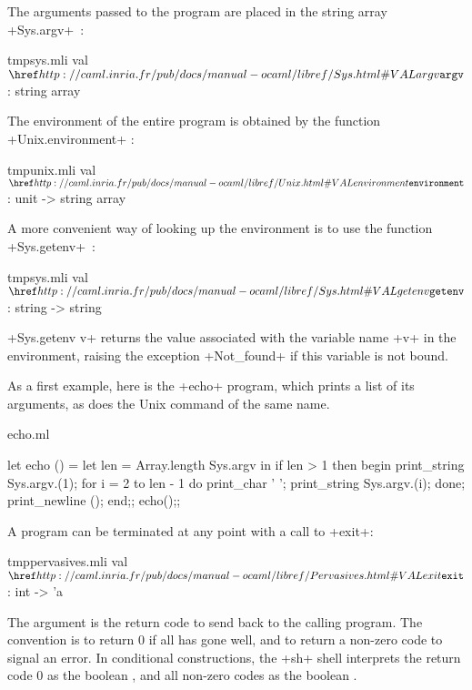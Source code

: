 The arguments passed to the program are placed in the string array
\ml+Sys.argv+~:



%
\begin{listingcodefile}{tmpsys.mli}
val $\indexlibvalue{Sys}{argv}$ : string array
\end{listingcodefile}
%

The environment of the entire program is obtained by the function
\ml+Unix.environment+ :

%
\begin{listingcodefile}{tmpunix.mli}
val $\indexlibvalue{Unix}{environment}$ : unit -> string array
\end{listingcodefile}
%

A more convenient way of looking up the environment is to use the
function \ml+Sys.getenv+~:


%
\begin{listingcodefile}{tmpsys.mli}
val $\indexlibvalue{Sys}{getenv}$ : string -> string
\end{listingcodefile}
%

\ml+Sys.getenv v+ returns the value associated with the variable name
\ml+v+ in 
the environment, raising the exception  \ml+Not_found+ if this 
variable is not bound.




%
\begin{example}

As a first example, here is the \ml+echo+ program, which prints a
list of its arguments, as does the Unix command of the same name.

\begin{listingcodefile}{echo.ml}

let echo () = 
  let len = Array.length Sys.argv in
  if len > 1 then 
    begin
      print_string Sys.argv.(1); 
      for i = 2 to len - 1 do 
        print_char ' ';
        print_string Sys.argv.(i); 
      done;
      print_newline ();
    end;;
echo();;
\end{listingcodefile}
\end{example}

A program can be terminated at any point with a call to \ml+exit+:

%
\begin{listingcodefile}{tmppervasives.mli}
val $\indexlibvalue{Pervasives}{exit}$ : int -> 'a
\end{listingcodefile}
%
%

The argument is the return code to send back to the calling program. The
convention is to return 0 if all has gone well, and to return a
non-zero code to signal an error. In conditional constructions, the
\ml+sh+ shell interprets the return code 0 as the boolean
, and all non-zero codes as the boolean .


